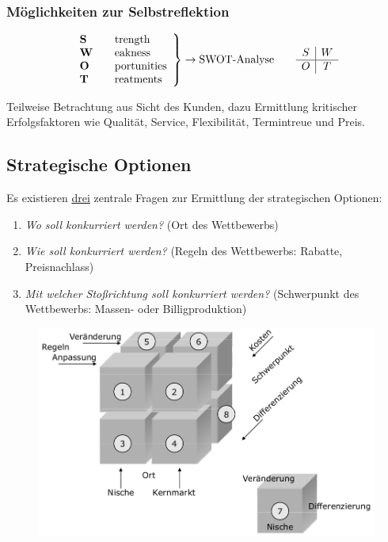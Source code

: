 \documentclass[a4paper,11pt, twoside]{article}
\newcommand\mpar[1]{\marginpar {\flushleft\small #1}}
\begin{document}
\subsubsection*{Möglichkeiten zur Selbstreflektion}
\mpar{\textcolor{red}{Erhebungen durch Kundenbefragung ODER Vergleich mit Konkurrenz}}
\[ \left.
\begin{array}{l l}
\text{\textbf{S}} & \quad \text{trength}\\
\text{\textbf{W}} & \quad \text{eakness}\\
\text{\textbf{O}} & \quad \text{portunities}\\
\text{\textbf{T}} & \quad \text{reatments}
\end{array} 
\right\} \to \text{SWOT-Analyse} \quad \quad	\begin{array}{c|c}
					  	 S & W \\
					  	 \hline
					  	 O & T
						\end{array} \]

Teilweise Betrachtung aus Sicht des Kunden, dazu Ermittlung kritischer Erfolgsfaktoren wie Qualität, Service, Flexibilität, Termintreue und Preis.

\subsection{Strategische Optionen}

\mpar{\textcolor{red}{Nischenmarkt: schwierig, falls besetzt}}
Es existieren \underline{drei} zentrale Fragen zur Ermittlung der strategischen Optionen:
\begin{enumerate}
	\item \textit{Wo soll konkurriert werden?} (Ort des Wettbewerbs)
	\item \textit{Wie soll konkurriert werden?} (Regeln des Wettbewerbs: Rabatte, Preisnachlass)
	\item \textit{Mit welcher Stoßrichtung soll konkurriert werden?} (Schwerpunkt des Wettbewerbs: Massen- oder Billigproduktion)
\end{enumerate}

\begin{figure}[h]
 \begin{center}
   \includegraphics[scale=0.3]{bilder/strategische_optionen.png}
 \end{center}
\end{figure}
\end{document}
